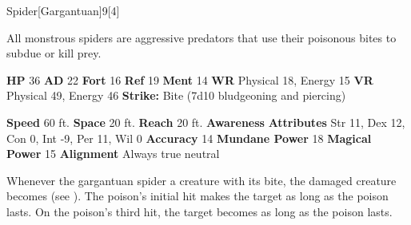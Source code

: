   \begin{monsection}{Spider}[Gargantuan]{9}[4]
    \vspace{-1em}\vspace{-1em}
    \vspace{0em}

    
    All monstrous spiders are aggressive predators that use their poisonous bites to subdue or kill prey.
  
    

    \begin{spellcontent}
      \begin{spelltargetinginfo}
        \pari \textbf{HP} 36 \monsep
          \textbf{AD} 22 \monsep
          \textbf{Fort} 16 \monsep
          \textbf{Ref} 19 \monsep
          \textbf{Ment} 14
        \pari \textbf{WR} Physical 18, Energy 15 \monsep
        \textbf{VR} Physical 49, Energy 46
        \pari \textbf{Strike:}
            Bite  (7d10 bludgeoning and piercing)
      \end{spelltargetinginfo}
    \end{spellcontent}
    \begin{monsterfooter}
      \pari \textbf{Speed} 60 ft. \monsep
        \textbf{Space} 20 ft. \monsep
        \textbf{Reach} 20 ft.
      \pari \textbf{Awareness} 
      \pari \textbf{Attributes}
        Str 11, Dex 12,
        Con 0, Int -9,
        Per 11, Wil 0
      \pari \textbf{Accuracy} 14 \monsep
        \textbf{Mundane Power} 18 \monsep
      \textbf{Magical Power} 15
      \pari \textbf{Alignment} Always true neutral
    \end{monsterfooter}
  \end{monsection}
        Whenever the gargantuan spider  a creature with its bite,
          the damaged creature becomes  (see ).
        The poison's initial hit makes the target  as long as the poison lasts.
        On the poison's third hit, the target becomes  as long as the poison lasts.
  
